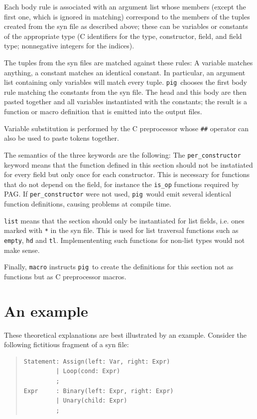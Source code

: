 \documentclass[a4paper,12pt]{article}
\def\pig{{\tt pig}}
\begin{document}
Each body rule is associated with an argument list whose members
(except the first one, which is ignored in matching) correspond to
the members of the tuples created from the syn file as described
above; these can be variables or constants of the appropriate type
(C identifiers for the type, constructor, field, and field type;
nonnegative integers for the indices).

The tuples from the syn files are matched against these rules: A
variable matches anything, a constant matches an identical constant.
In particular, an argument list containing only variables will match
every tuple. \pig\ chooses the first body rule matching the
constants from the syn file. The head and this body are then pasted
together and all variables instantiated with the constants; the
result is a function or macro definition that is emitted into the
output files.

Variable substitution is performed by the C preprocessor whose
\verb+##+ operator can also be used to paste tokens together.

The semantics of the three keywords are the following: The
\verb+per_constructor+ keyword means that the function defined in
this section should not be instatiated for every field but only once
for each constructor. This is necessary for functions that do not
depend on the field, for instance the \verb+is_op+ functions
required by PAG. If \verb+per_constructor+ were not used, \pig\
would emit several identical function definitions, causing problems
at compile time.

\verb+list+ means that the section should only be instantiated for
list fields, i.e. ones marked with \verb+*+ in the syn file. This is
used for list traversal functions such as \verb+empty+, \verb+hd+
and \verb+tl+. Implemententing such functions for non-list types
would not make sense.

Finally, \verb+macro+ instructs \pig\ to create the definitions for
this section not as functions but as C preprocessor macros.

\section{An example}

These theoretical explanations are best illustrated by an example.
Consider the following fictitious fragment of a syn file:

\begin{quote}
\begin{verbatim}
Statement: Assign(left: Var, right: Expr)
         | Loop(cond: Expr)
         ;
Expr     : Binary(left: Expr, right: Expr)
         | Unary(child: Expr)
         ;
\end{verbatim}
\end{quote}
\end{document}
